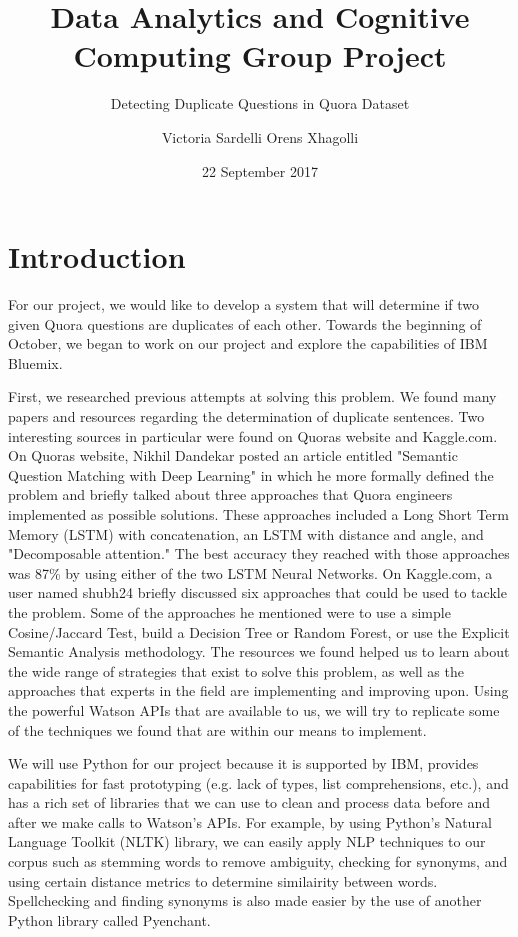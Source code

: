 \documentclass{sig-alternate}
\begin{document}
\title{Data Analytics and Cognitive Computing Group Project}
\subtitle{Detecting Duplicate Questions in Quora Dataset}
\author{
\alignauthor
Victoria Sardelli
\alignauthor
Orens Xhagolli
}
\date{22 September 2017}
\maketitle

\section{Introduction}
\label{introduction}
For our project, we would like to develop a system that will determine if two given Quora questions are duplicates of each other. Towards the beginning of October, we began to work on our project and explore the capabilities of IBM Bluemix.

First, we researched previous attempts at solving this problem. We found many papers and resources regarding the determination of duplicate sentences. Two interesting sources in particular were found on Quora\textsc{}s website and Kaggle.com. On Quora\textsc{}s website, Nikhil Dandekar posted an article entitled "Semantic Question Matching with Deep Learning" in which he more formally defined the problem and briefly talked about three approaches that Quora engineers implemented as possible solutions. These approaches included a Long Short Term Memory (LSTM) with concatenation, an LSTM with distance and angle, and "Decomposable attention." The best accuracy they reached with those approaches was 87\% by using either of the two LSTM Neural Networks. On Kaggle.com, a user named shubh24 briefly discussed six approaches that could be used to tackle the problem. Some of the approaches he mentioned were to use a simple Cosine/Jaccard Test, build a Decision Tree or Random Forest, or use the Explicit Semantic Analysis methodology. The resources we found helped us to learn about the wide range of strategies that exist to solve this problem, as well as the approaches that experts in the field are implementing and improving upon. Using the powerful Watson APIs that are available to us, we will try to replicate some of the techniques we found that are within our means to implement.

We will use Python for our project because it is supported by IBM, provides capabilities for fast prototyping (e.g. lack of types, list comprehensions, etc.), and has a rich set of libraries that we can use to clean and process data before and after we make calls to Watson's APIs. For example, by using Python's Natural Language Toolkit (NLTK) library, we can easily apply NLP techniques to our corpus such as stemming words to remove ambiguity, checking for synonyms, and using certain distance metrics to determine similairity between words. Spellchecking and finding synonyms is also made easier by the use of another Python library called Pyenchant.
\end{document}
